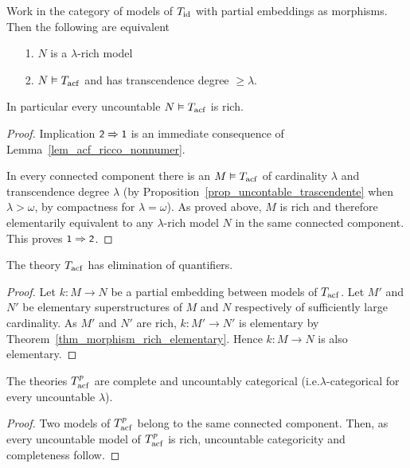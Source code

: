 \begin{corollary}\label{corol_acfUltraOmog}
Work in the category of models of $T_{\rm id}$ with partial embeddings as morphisms. Then the following are equivalent
%
\begin{itemize}
\item[1.] $N$ is a $\lambda$-rich model
\item[2.] $N\models T_{\rm acf}$ and has transcendence degree $\ge\lambda$.
\end{itemize}
In particular every uncountable $N\models T_{\rm acf}$ is rich.
\end{corollary}
\begin{proof}
Implication $\ssf{2}\IMP\ssf{1}$ is an immediate consequence of Lemma~\ref{lem_acf_ricco_nonnumer}.

In every connected component there is an $M\models T_{\rm acf}$ of cardinality $\lambda$ and transcendence degree $\lambda$ (by Proposition~\ref{prop_uncontable_trascendente} when $\lambda>\omega$, by compactness for $\lambda=\omega$).
%
As proved above, $M$ is rich and therefore elementarily equivalent to any $\lambda$-rich model $N$ in the same connected component.
%
This proves $\ssf{1}\IMP\ssf{2}$.
\end{proof}

\begin{corollary}\label{corol_QE_acf}
The theory $T_{\rm acf}$ has elimination of quantifiers.
\end{corollary}

\begin{proof}
Let $k:M\to N$ be a partial embedding between models of $T_{\rm acf}$.
%
Let $M'$ and $N'$ be elementary superstructures of $M$ and $N$ respectively of sufficiently large cardinality.
%
As $M'$ and $N'$ are rich, $k:M'\to N'$ is elementary by Theorem~\ref{thm_morphism_rich_elementary}.
%
Hence $k:M\to N$ is also elementary.
\end{proof}

\begin{corollary}
The theories $T^p_{\rm acf}$ are complete and uncountably categorical (i.e.\@ $\lambda$-cate\-gori\-cal for every uncountable $\lambda$).
\end{corollary}
\begin{proof}
Two models of $T^p_{\rm acf}$ belong to the same connected component.
%
Then, as every uncountable model of $T^p_{\rm acf}$ is rich, uncountable categoricity and completeness follow.
\end{proof}

